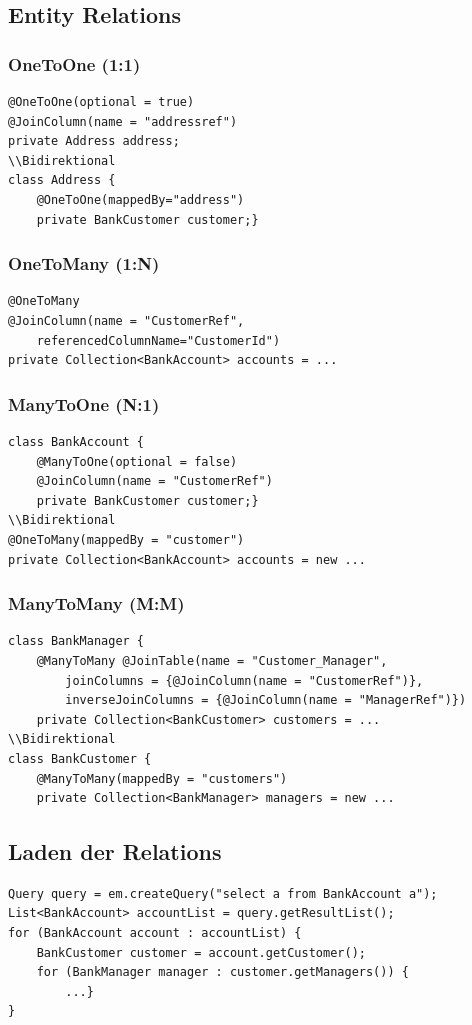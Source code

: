 \begin{multicols}{2}
    \subsection{Entity Relations}
        \subsubsection{OneToOne (1:1)}
\begin{lstlisting}[style=Java]
@OneToOne(optional = true)
@JoinColumn(name = "addressref")
private Address address;
\\Bidirektional
class Address {
    @OneToOne(mappedBy="address")
    private BankCustomer customer;}
\end{lstlisting}
        \subsubsection{OneToMany (1:N)}
\begin{lstlisting}[style=Java]
@OneToMany
@JoinColumn(name = "CustomerRef",
    referencedColumnName="CustomerId")
private Collection<BankAccount> accounts = ...
\end{lstlisting}
        \subsubsection{ManyToOne (N:1)}
\begin{lstlisting}[style=Java]
class BankAccount { 
    @ManyToOne(optional = false) 
    @JoinColumn(name = "CustomerRef") 
    private BankCustomer customer;}
\\Bidirektional
@OneToMany(mappedBy = "customer")
private Collection<BankAccount> accounts = new ...
\end{lstlisting}
        \subsubsection{ManyToMany (M:M)}
\begin{lstlisting}[style=Java]
class BankManager { 
    @ManyToMany @JoinTable(name = "Customer_Manager", 
        joinColumns = {@JoinColumn(name = "CustomerRef")}, 
        inverseJoinColumns = {@JoinColumn(name = "ManagerRef")}) 
    private Collection<BankCustomer> customers = ...
\\Bidirektional
class BankCustomer {
    @ManyToMany(mappedBy = "customers")
    private Collection<BankManager> managers = new ...
\end{lstlisting}
    \subsection{Laden der Relations}
\begin{lstlisting}[style=Java]
Query query = em.createQuery("select a from BankAccount a");
List<BankAccount> accountList = query.getResultList();
for (BankAccount account : accountList) {
    BankCustomer customer = account.getCustomer();
    for (BankManager manager : customer.getManagers()) {
        ...}
}
\end{lstlisting}
    \end{multicols}
    
